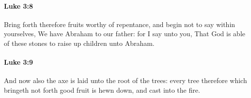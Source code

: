 		\paragraph{Luke 3:8} %
			\label{LUKE-3-8}

			Bring forth therefore fruits worthy of repentance, and begin not to say within yourselves, We have Abraham to our father: for I say unto you, That God is able of these stones to raise up children unto Abraham.

			\begin{framed}
			\scriptsize
				\begin{compactdesc}
					\item[SBLG] 
				\end{compactdesc}
			\end{framed}

		\paragraph{Luke 3:9} %
			\label{LUKE-3-9}

			And now also the axe is laid unto the root of the trees: every tree therefore which bringeth not forth good fruit is hewn down, and cast into the fire.

